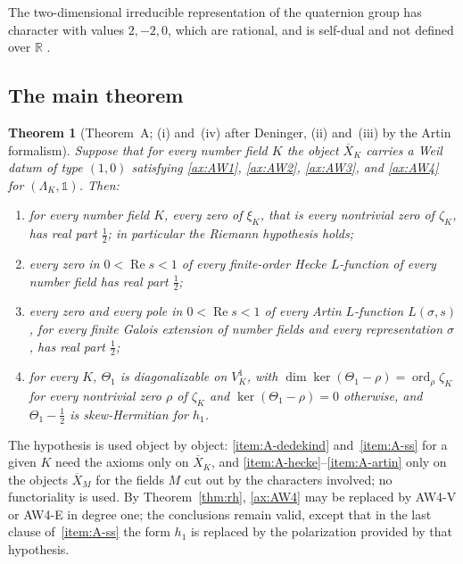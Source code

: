 \documentclass[11pt]{amsart}
\theoremstyle{plain}
\newtheorem{theorem}{Theorem}[section]
\theoremstyle{definition}
\theoremstyle{remark}
\numberwithin{equation}{section}
\newcommand{\R}{\mathbb{R}}
\newcommand{\Xbar}{\overline{X}}
\DeclareMathOperator{\Rea}{Re}
\DeclareMathOperator{\ord}{ord}
\renewcommand{\Re}{\Rea}
\begin{document}
The two-dimensional irreducible representation of the quaternion
group has character with values $2,-2,0$, which are rational, and is
self-dual and not defined over $\R$ \cite[Example~1.1, p.~1]%
{ConradFrobeniusSchur}.

\subsection{The main theorem}\label{subsec:thmA}

\begin{theorem}[{Theorem~A; (i) and~(iv) after Deninger, (ii) and~(iii)
by the Artin formalism}]\label{thm:A}
Suppose that for every number field $K$ the object $\Xbar_K$ carries a
Weil datum of type $(1,0)$ satisfying \ref{ax:AW1}, \ref{ax:AW2},
\ref{ax:AW3}, and \ref{ax:AW4} for $(\Lambda_K,\mathbb 1)$. Then:
\begin{enumerate}[label=(\roman*)]
\item\label{item:A-dedekind} for every number field $K$, every zero of
  $\xi_K$, that is every nontrivial zero of $\zeta_K$, has real part
  $\tfrac12$; in particular the Riemann hypothesis holds;
\item\label{item:A-hecke} every zero in $0<\Re s<1$ of every
  finite-order Hecke $L$-function of every number field has real part
  $\tfrac12$;
\item\label{item:A-artin} every zero and every pole in $0<\Re s<1$ of
  every Artin $L$-function $L(\sigma,s)$, for every finite Galois
  extension of number fields and every representation $\sigma$, has
  real part $\tfrac12$;
\item\label{item:A-ss} for every $K$, $\Theta_1$ is diagonalizable on
  $V^1_K$, with $\dim\ker(\Theta_1-\rho)=\ord_\rho\zeta_K$ for every
  nontrivial zero $\rho$ of $\zeta_K$ and $\ker(\Theta_1-\rho)=0$
  otherwise, and $\Theta_1-\tfrac12$ is skew-Hermitian for $h_1$.
\end{enumerate}
\end{theorem}

The hypothesis is used object by object: \ref{item:A-dedekind}
and~\ref{item:A-ss} for a given $K$ need the axioms only on $\Xbar_K$,
and \ref{item:A-hecke}--\ref{item:A-artin} only on the objects $\Xbar_M$
for the fields $M$ cut out by the characters involved; no functoriality
is used. By Theorem~\ref{thm:rh}, \ref{ax:AW4} may be replaced by AW4-V
or AW4-E in degree one; the conclusions remain valid, except that in
the last clause of~\ref{item:A-ss} the form $h_1$ is replaced by the
polarization provided by that hypothesis.
\end{document}
